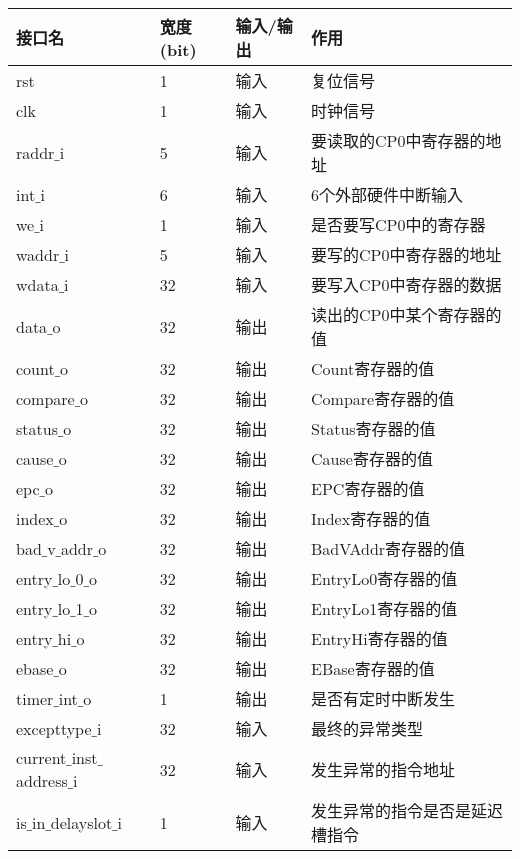 \quad
	\begin{longtable}{|l|l|l|l|}
		\hline
		接口名 & 宽度(bit) & 输入/输出 & 作用 \\
		\hline
		rst & 1 & 输入 & 复位信号 \\
		\hline
		clk & 1 & 输入 & 时钟信号 \\
		\hline
		raddr$\_$i & 5 & 输入 & 要读取的CP0中寄存器的地址 \\
		\hline
		int$\_$i & 6 & 输入 & 6个外部硬件中断输入 \\
		\hline
		we$\_$i & 1 & 输入 & 是否要写CP0中的寄存器 \\
		\hline
		waddr$\_$i & 5 & 输入 & 要写的CP0中寄存器的地址 \\
		\hline
		wdata$\_$i & 32 & 输入 & 要写入CP0中寄存器的数据 \\
		\hline
		data$\_$o & 32 & 输出 & 读出的CP0中某个寄存器的值 \\
		\hline
		count$\_$o & 32 & 输出 & Count寄存器的值 \\
		\hline
		compare$\_$o & 32 & 输出 & Compare寄存器的值 \\
		\hline
		status$\_$o & 32 & 输出 & Status寄存器的值 \\
		\hline
		cause$\_$o & 32 & 输出 & Cause寄存器的值 \\
		\hline
		epc$\_$o & 32 & 输出 & EPC寄存器的值 \\
		\hline
		index$\_$o & 32 & 输出 & Index寄存器的值 \\
		\hline
		bad$\_$v$\_$addr$\_$o & 32 & 输出 & BadVAddr寄存器的值 \\
		\hline
		entry$\_$lo$\_$0$\_$o & 32 & 输出 & EntryLo0寄存器的值 \\
		\hline
		entry$\_$lo$\_$1$\_$o & 32 & 输出 & EntryLo1寄存器的值 \\
		\hline
		entry$\_$hi$\_$o & 32 & 输出 & EntryHi寄存器的值 \\
		\hline
		ebase$\_$o & 32 & 输出 & EBase寄存器的值 \\
		\hline
		timer$\_$int$\_$o & 1 & 输出 & 是否有定时中断发生 \\
		\hline
		excepttype$\_$i & 32 & 输入 & 最终的异常类型 \\
		\hline
		current$\_$inst$\_$address$\_$i & 32 & 输入 & 发生异常的指令地址 \\
		\hline
		is$\_$in$\_$delayslot$\_$i & 1 & 输入 & 发生异常的指令是否是延迟槽指令 \\
		\hline
	\end{longtable}
